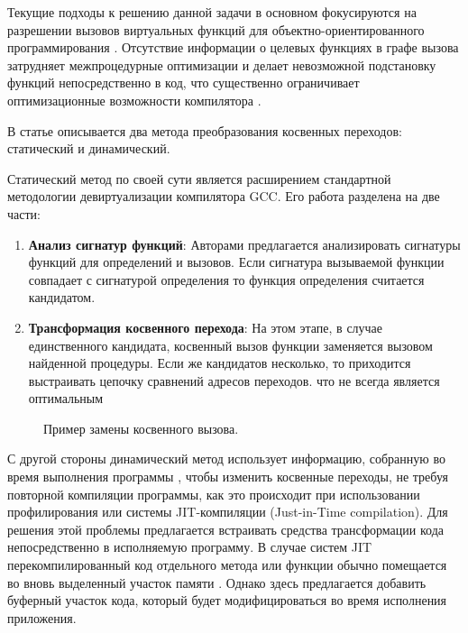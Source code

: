 Текущие подходы к решению данной задачи в основном фокусируются на разрешении вызовов виртуальных функций для объектно-ориентированного программирования \cite{namolaru2006devirtualization,padlewski2017devirtualization}. Отсутствие информации о целевых функциях в графе вызова затрудняет межпроцедурные оптимизации и делает невозможной подстановку функций непосредственно в код, что существенно ограничивает оптимизационные возможности компилятора \cite{li2010lightweight,pande1996data}.


В статье \cite{chernonog2023статический} описывается два метода преобразования косвенных переходов: статический и динамический.  

Статический метод по своей сути является расширением стандартной методологии девиртуализации компилятора GCC. Его работа разделена на две части:

\begin{enumerate}
	\item \textbf{Анализ сигнатур функций}: Авторами предлагается анализировать сигнатуры функций для определений и вызовов. Если сигнатура вызываемой функции совпадает с сигнатурой определения то функция определения считается кандидатом.
	\item \textbf{Трансформация косвенного перехода}: На этом этапе, в случае единственного кандидата, косвенный вызов функции заменяется вызовом найденной процедуры. Если же кандидатов несколько, то приходится выстраивать цепочку сравнений адресов переходов. что не всегда является оптимальным
\end{enumerate}


\begin{figure}[ht]
	\caption{Пример замены косвенного вызова.}\label{fig:ICP1}
\end{figure}

С другой стороны динамический метод использует информацию, собранную во время выполнения программы \cite{baev2015profile,ishizaki2000study}, чтобы изменить косвенные переходы, не требуя повторной компиляции программы, как это происходит при использовании профилирования или системы JIT-компиляции (Just-in-Time compilation). Для решения этой проблемы предлагается встраивать средства трансформации кода непосредственно в исполняемую программу. В случае систем JIT перекомпилированный код отдельного метода или функции обычно помещается во вновь выделенный участок памяти \cite{cravvford1988study}. Однако здесь предлагается
добавить буферный участок кода, который будет модифицироваться во время исполнения приложения.

